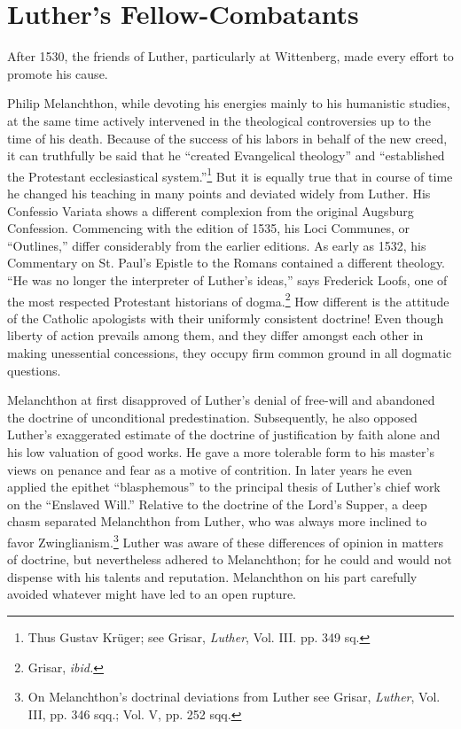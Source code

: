 \section{Luther’s Fellow-Combatants}

After 1530, the friends of Luther, particularly at Wittenberg,
made every effort to promote his cause.

Philip Melanchthon, while devoting his energies mainly to his
humanistic studies, at the same time actively intervened in the theological
controversies up to the time of his death. Because of the
success of his labors in behalf of the new creed, it can truthfully
be said that he “created Evangelical theology” and “established the
Protestant ecclesiastical system.”\footnote{Thus Gustav Krüger; see Grisar, \textit{Luther}, Vol. III. pp. 349 sq.}
 But it is equally true that in course
of time he changed his teaching in many points and deviated widely
from Luther. His Confessio Variata shows a different complexion
from the original Augsburg Confession. Commencing with the
edition of 1535, his Loci Communes, or “Outlines,” differ considerably
from the earlier editions. As early as 1532, his Commentary
on St. Paul’s Epistle to the Romans contained a different theology.
“He was no longer the interpreter of Luther’s ideas,” says Frederick
Loofs, one of the most respected Protestant historians of dogma.\footnote{Grisar, \textit{ibid.}}
How different is the attitude of the Catholic apologists with their
uniformly consistent doctrine! Even though liberty of action prevails
among them, and they differ amongst each other in making
unessential concessions, they occupy firm common ground in all
dogmatic questions.

Melanchthon at first disapproved of Luther’s denial of free-will
and abandoned the doctrine of unconditional predestination. Subsequently,
he also opposed Luther’s exaggerated estimate of the
doctrine of justification by faith alone and his low valuation of good
works. He gave a more tolerable form to his master’s views on
penance and fear as a motive of contrition. In later years he even
applied the epithet ``blasphemous'' to the principal thesis of Luther’s
chief work on the “Enslaved Will.” Relative to the doctrine of the
Lord’s Supper, a deep chasm separated Melanchthon from Luther,
who was always more inclined to favor Zwinglianism.\footnote
{On Melanchthon’s doctrinal deviations from Luther see Grisar, \textit{Luther}, Vol. III, pp.
346 sqq.; Vol. V, pp. 252 sqq.}
Luther
was aware of these differences of opinion in matters of doctrine,
but nevertheless adhered to Melanchthon; for he could and would
not dispense with his talents and reputation. Melanchthon on
his part carefully avoided whatever might have led to an open rupture.

